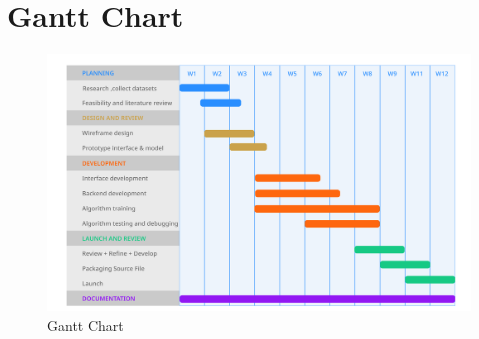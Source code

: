 \section{Gantt Chart}
\begin{figure}[H]
    \centering
    \includegraphics[width=150mm]{./img/gantt_chart.png}
    \caption{Gantt Chart}
\end{figure}